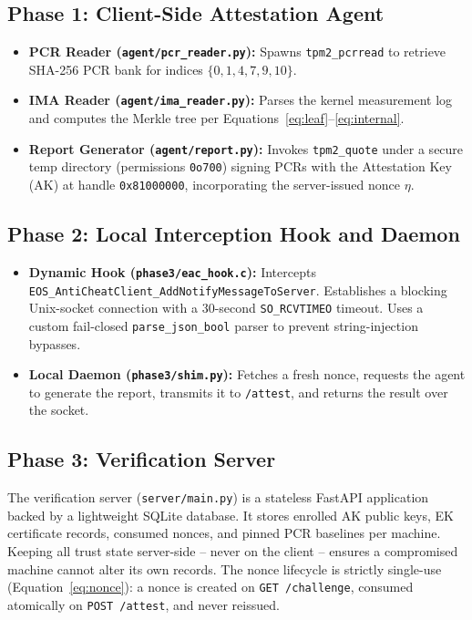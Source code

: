 \documentclass[11pt]{article}
\begin{document}
\subsection{Phase 1: Client-Side Attestation Agent}
\begin{itemize}[nosep]
  \item \textbf{PCR Reader (\texttt{agent/pcr\_reader.py}):} Spawns \texttt{tpm2\_pcrread} to retrieve SHA-256 PCR bank for indices $\{0,1,4,7,9,10\}$.
  \item \textbf{IMA Reader (\texttt{agent/ima\_reader.py}):} Parses the kernel measurement log and computes the Merkle tree per Equations~\ref{eq:leaf}--\ref{eq:internal}.
  \item \textbf{Report Generator (\texttt{agent/report.py}):} Invokes \texttt{tpm2\_quote} under a secure temp directory (permissions \texttt{0o700}) signing PCRs with the Attestation Key (AK) at handle \texttt{0x81000000}, incorporating the server-issued nonce $\eta$.
\end{itemize}

\subsection{Phase 2: Local Interception Hook and Daemon}
\begin{itemize}[nosep]
  \item \textbf{Dynamic Hook (\texttt{phase3/eac\_hook.c}):} Intercepts \texttt{EOS\_AntiCheatClient\_AddNotifyMessageToServer}. Establishes a blocking Unix-socket connection with a 30-second \texttt{SO\_RCVTIMEO} timeout. Uses a custom fail-closed \texttt{parse\_json\_bool} parser to prevent string-injection bypasses.
  \item \textbf{Local Daemon (\texttt{phase3/shim.py}):} Fetches a fresh nonce, requests the agent to generate the report, transmits it to \texttt{/attest}, and returns the result over the socket.
\end{itemize}

\subsection{Phase 3: Verification Server}
The verification server (\texttt{server/main.py}) is a stateless FastAPI application backed by a lightweight SQLite database. It stores enrolled AK public keys, EK certificate records, consumed nonces, and pinned PCR baselines per machine. Keeping all trust state server-side -- never on the client -- ensures a compromised machine cannot alter its own records. The nonce lifecycle is strictly single-use (Equation~\ref{eq:nonce}): a nonce is created on \texttt{GET /challenge}, consumed atomically on \texttt{POST /attest}, and never reissued.
\end{document}
